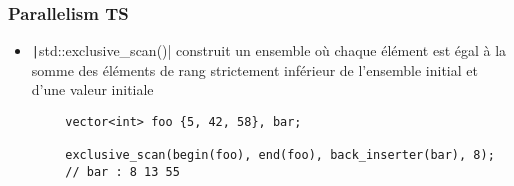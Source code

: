 \documentclass[C++.tex]{subfiles}
\begin{document}
\begin{frame}[fragile]
	\frametitle{Parallelism TS}
	\begin{itemize}
		\item \texttt|std::exclusive_scan()| construit un ensemble où chaque élément est égal à la somme des éléments de rang strictement inférieur de l'ensemble initial et d'une valeur initiale
	\end{itemize}

	\begin{verbatim}
		vector<int> foo {5, 42, 58}, bar;

		exclusive_scan(begin(foo), end(foo), back_inserter(bar), 8);
		// bar : 8 13 55
	\end{verbatim}


\end{frame}
\end{document}
